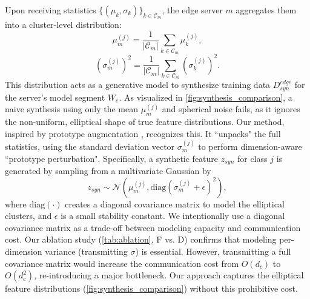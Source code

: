        Upon receiving statistics $\{(\mu_k, \sigma_k)\}_{k \in \mathcal{C}_m}$, the edge server $m$ aggregates them into a cluster-level distribution:
        \begin{equation}
            \mu_m^{(j)} = \frac{1}{|\mathcal{C}_m|} \sum_{k \in \mathcal{C}_m} \mu_k^{(j)},
        \end{equation}
        \begin{equation}
            (\sigma_m^{(j)})^2 = \frac{1}{|\mathcal{C}_m|} \sum_{k \in \mathcal{C}_m} (\sigma_k^{(j)})^2.
        \end{equation}
        This distribution acts as a generative model to synthesize training data $D_{syn}^{edge}$ for the server's model segment $W_e$. As visualized in \cref{fig:synthesis_comparison}, a naive synthesis using only the mean $\mu_m^{(j)}$ and spherical noise fails, as it ignores the non-uniform, elliptical shape of true feature distributions. Our method, inspired by prototype augmentation \cite{zhu2021prototype}, recognizes this. It ``unpacks" the full statistics, using the standard deviation vector $\sigma_m^{(j)}$ to perform dimension-aware ``prototype perturbation". Specifically, a synthetic feature $z_{syn}$ for class $j$ is generated by sampling from a multivariate Gaussian by
        \begin{equation}
            \label{eq:synthesis}
            z_{syn} \sim \mathcal{N}(\mu_m^{(j)}, \text{diag}(\sigma_m^{(j)} + \epsilon)^2),
        \end{equation}
        where $\text{diag}(\cdot)$ creates a diagonal covariance matrix to model the elliptical clusters, and $\epsilon$ is a small stability constant. We intentionally use a diagonal covariance matrix as a trade-off between modeling capacity and communication cost. Our ablation study (\cref{tab:ablation}, F vs. D) confirms that modeling per-dimension variance (transmitting $\sigma$) is essential. However, transmitting a full covariance matrix would increase the communication cost from $O(d_c)$ to $O(d_c^2)$, re-introducing a major bottleneck. Our approach captures the elliptical feature distributions (\cref{fig:synthesis_comparison}) without this prohibitive cost.

